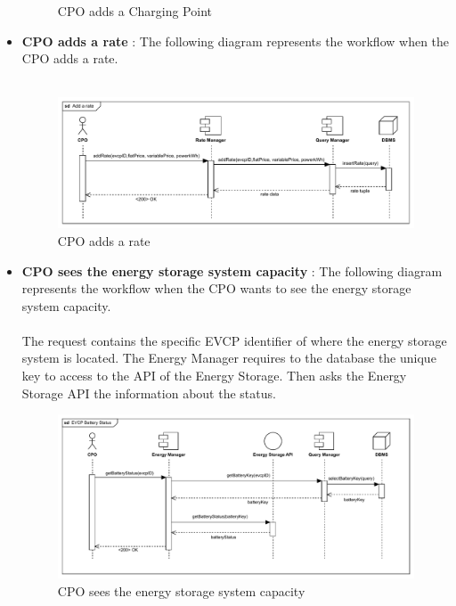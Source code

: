 \begin{itemize}
\begin{figure}[H]
              \caption{CPO adds a Charging Point}
          \end{figure}
    \item \textbf{CPO adds a rate} : The following diagram represents the workflow when the CPO adds a rate.\\
          \\
          \begin{figure}[H]
              \centering
              \includegraphics[scale=0.55]{src/runtimeView/CPMS_addRate.pdf}
              \caption{CPO adds a rate}
          \end{figure}
          \pagebreak
    \item \textbf{CPO sees the energy storage system capacity} : The following diagram represents the workflow when the CPO wants to see the energy storage system capacity.\\
          \\ The request contains the specific EVCP identifier of where the energy storage system is located. The Energy Manager requires to the database the unique key to access
          to the API of the Energy Storage. Then asks the Energy Storage API the information about the status.
          \begin{figure}[H]
              \centering
              \includegraphics[scale=0.55]{src/runtimeView/CPMS_batteryCapacity.pdf}
              \caption{CPO sees the energy storage system capacity}
          \end{figure}

\end{itemize}
